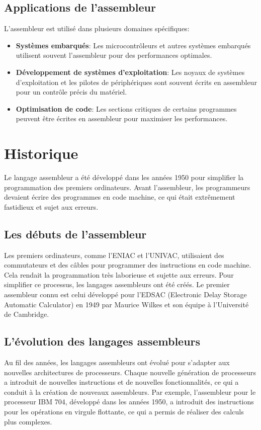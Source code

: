 \documentclass[a4paper, 12pt]{report}
\begin{document}
\section{Applications de l'assembleur}
L'assembleur est utilisé dans plusieurs domaines spécifiques:
\begin{itemize}
  \item \textbf{Systèmes embarqués}: Les microcontrôleurs et autres systèmes embarqués utilisent souvent l'assembleur pour des performances optimales.
  \item \textbf{Développement de systèmes d'exploitation}: Les noyaux de systèmes d'exploitation et les pilotes de périphériques sont souvent écrits en assembleur pour un contrôle précis du matériel.
  \item \textbf{Optimisation de code}: Les sections critiques de certains programmes peuvent être écrites en assembleur pour maximiser les performances.
\end{itemize}

\chapter{Historique}
Le langage assembleur a été développé dans les années 1950 pour simplifier la programmation des premiers ordinateurs. Avant l'assembleur, les programmeurs devaient écrire des programmes en code machine, ce qui était extrêmement fastidieux et sujet aux erreurs.

\section{Les débuts de l'assembleur}
Les premiers ordinateurs, comme l'ENIAC et l'UNIVAC, utilisaient des commutateurs et des câbles pour programmer des instructions en code machine. Cela rendait la programmation très laborieuse et sujette aux erreurs. Pour simplifier ce processus, les langages assembleurs ont été créés. Le premier assembleur connu est celui développé pour l'EDSAC (Electronic Delay Storage Automatic Calculator) en 1949 par Maurice Wilkes et son équipe à l'Université de Cambridge.

\section{L'évolution des langages assembleurs}
Au fil des années, les langages assembleurs ont évolué pour s'adapter aux nouvelles architectures de processeurs. Chaque nouvelle génération de processeurs a introduit de nouvelles instructions et de nouvelles fonctionnalités, ce qui a conduit à la création de nouveaux assembleurs. Par exemple, l'assembleur pour le processeur IBM 704, développé dans les années 1950, a introduit des instructions pour les opérations en virgule flottante, ce qui a permis de réaliser des calculs plus complexes.
\end{document}
